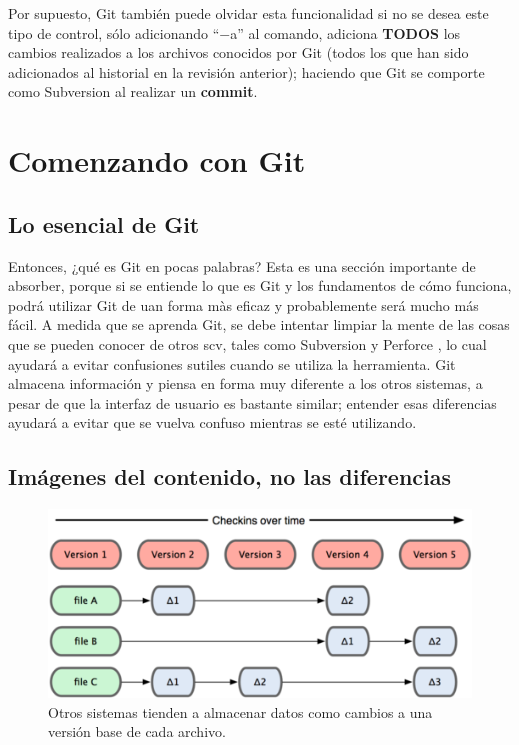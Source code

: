 \documentclass[12pt, spanish, oneside, onecolumn, a4paper]{report}
\begin{document}
Por supuesto, Git también puede olvidar esta funcionalidad si no se desea este tipo de control, sólo adicionando ``$-$a'' al comando, adiciona \textbf{TODOS} los cambios realizados a los archivos conocidos por Git (todos los que han sido adicionados al historial en la revisión anterior); haciendo que Git se comporte como Subversion al realizar un \textbf{commit}.


\chapter{Comenzando con Git}
\label{chap:gettingstarted}

\section{Lo esencial de Git}
\label{sec:gitbasics}

Entonces, ¿qué es Git en pocas palabras? Esta es una sección importante de absorber, porque si se entiende lo que es Git y los
fundamentos de cómo funciona, podrá utilizar Git de uan forma màs eficaz y probablemente será mucho más fácil. A medida que se aprenda Git, se debe intentar limpiar la mente de las cosas que se pueden conocer de otros \gls{scv}, tales como Subversion y Perforce , lo cual ayudará a evitar confusiones sutiles cuando se utiliza la herramienta. Git almacena información y piensa en forma muy diferente a los otros sistemas, a pesar de que la interfaz de usuario es bastante similar; entender esas diferencias ayudará a evitar que se vuelva confuso mientras se esté utilizando.

\section{Imágenes del contenido, no las diferencias}
\label{sec:snapshotsnotdifferences}


\begin{figure}
  \begin{center}
  \includegraphics[width=.6\textwidth,keepaspectratio=true]{18333fig0104-tn.png}
  \end{center}
  \caption{Otros sistemas tienden a almacenar datos como cambios a una versión base de cada archivo.}
  \label{otrosvcs}
\end{figure}
\end{document}
